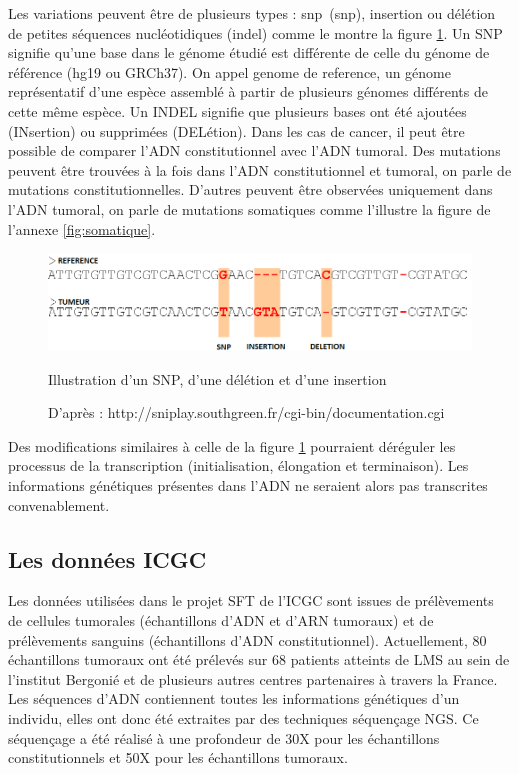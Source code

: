 Les variations peuvent être de plusieurs types : \og \acrlong{snp}\fg ~(\acrshort{snp}), insertion ou délétion de petites séquences nucléotidiques (\acrshort{indel}) comme le montre la figure \ref{snp}. Un SNP signifie qu'une base dans le génome étudié est différente de celle du génome de référence (hg19 ou GRCh37). On appel \gls{genome de reference}, un génome représentatif d'une espèce assemblé à partir de plusieurs génomes différents de cette même espèce. Un INDEL signifie que plusieurs bases ont été ajoutées (INsertion) ou supprimées (DELétion). Dans les cas de cancer, il peut être possible de comparer l'\gls{ADN constitutionnel} avec l'\gls{ADN tumoral}. Des mutations peuvent être trouvées à la fois dans l'ADN constitutionnel et tumoral, on parle de mutations constitutionnelles. D'autres peuvent être observées uniquement dans l'ADN tumoral, on parle de  mutations somatiques comme l'illustre la figure de l'annexe \ref{fig:somatique}.

\begin{figure}[h]
\centering
\includegraphics[scale=0.6]{Figures/indel_snp.png}
\caption{Illustration d'un SNP, d'une délétion et d'une insertion}
\caption*{D'après : http://sniplay.southgreen.fr/cgi-bin/documentation.cgi}
\label{snp}
\end{figure}

Des modifications similaires à celle de la figure \ref{snp} pourraient déréguler les processus de la transcription (initialisation, élongation et terminaison). Les informations génétiques présentes dans l'ADN ne seraient alors pas transcrites convenablement.

\subsection{Les données ICGC}\label{subsec:NGS}

Les données utilisées dans le projet SFT de l'ICGC sont issues de prélèvements de cellules tumorales (échantillons d'ADN et d'ARN tumoraux) et de prélèvements sanguins (échantillons d'ADN constitutionnel). Actuellement, 80 échantillons tumoraux ont été prélevés sur 68 patients atteints de LMS au sein de l'institut Bergonié et de plusieurs autres centres partenaires à travers la France. Les séquences d'ADN contiennent toutes les informations génétiques d'un individu, elles ont donc été extraites par des techniques séquençage NGS. Ce séquençage a été réalisé à une profondeur de 30X pour les échantillons constitutionnels et 50X pour les échantillons tumoraux. 

